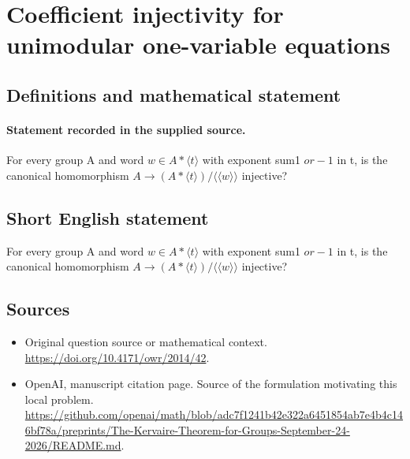 \documentclass[11pt]{article}
\begin{document}
\section*{Coefficient injectivity for unimodular one-variable equations}\label{30007201}
\subsection{Definitions and mathematical statement}
\paragraph{Statement recorded in the supplied source.}
For every group A and word $w\in A*\langle t\rangle $ with exponent sum1 $or-1$ in t, is the canonical homomorphism $A\to (A*\langle t\rangle )/\langle \langle w\rangle \rangle $ injective?
\subsection{Short English statement}
For every group A and word $w\in A*\langle t\rangle $ with exponent sum1 $or-1$ in t, is the canonical homomorphism $A\to (A*\langle t\rangle )/\langle \langle w\rangle \rangle $ injective?
\subsection{Sources}
\begin{itemize}
\item[S1] Original question source or mathematical context.
\url{https://doi.org/10.4171/owr/2014/42}.
\item[S2] OpenAI, manuscript citation page. Source of the formulation motivating this local problem.
\url{https://github.com/openai/math/blob/adc7f1241b42e322a6451854ab7e4b4c146bf78a/preprints/The-Kervaire-Theorem-for-Groups-September-24-2026/README.md}.
\end{itemize}
\end{document}
